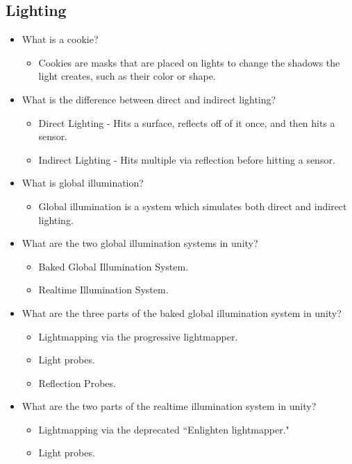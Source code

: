 \documentclass{article}
\begin{document}
\subsection{Lighting}
\begin{itemize}
    \item What is a cookie?
    \begin{itemize}
        \item Cookies are masks that are placed on lights to change the shadows the light creates, such as their color or shape.
    \end{itemize}
    \item What is the difference between direct and indirect lighting?
    \begin{itemize}
        \item Direct Lighting - Hits a surface, reflects off of it once, and then hits a sensor.
        \item Indirect Lighting - Hits multiple via reflection before hitting a sensor.
    \end{itemize}
    \item What is global illumination?
    \begin{itemize}
        \item Global illumination is a system which simulates both direct and indirect lighting.
    \end{itemize}
    \item What are the two global illumination systems in unity?
    \begin{itemize}
        \item Baked Global Illumination System.
        \item Realtime Illumination System.
    \end{itemize}
    \item What are the three parts of the baked global illumination system in unity?
    \begin{itemize}
        \item Lightmapping via the progressive lightmapper.
        \item Light probes.
        \item Reflection Probes.
    \end{itemize}
    \item What are the two parts of the realtime illumination system in unity?
    \begin{itemize}
        \item Lightmapping via the deprecated ``Enlighten lightmapper."
        \item Light probes.

\end{itemize}
\end{itemize}
\end{document}

